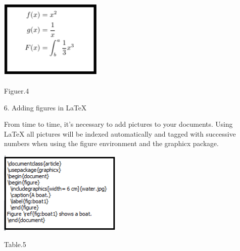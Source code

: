 \documentclass[onecolumn,journal] {IEEEtran}
\begin{document}
\center
\includegraphics[width=5cm]{dismat2.png}
\begin{center}
Figuer.4
\end{center} 

\begin{flushleft}
\begin{Large}
6. Adding figures in LaTeX 
\end{Large} 
\newline

From time to time, it's necessary to add pictures to your documents. Using LaTeX all pictures will be indexed automatically and tagged with successive numbers when using the figure environment and the graphicx package.
\end{flushleft}

\center
\includegraphics[width=6cm]{codepig1.png}
\begin{center}
Table.5
\end{center} 
\end{document}
